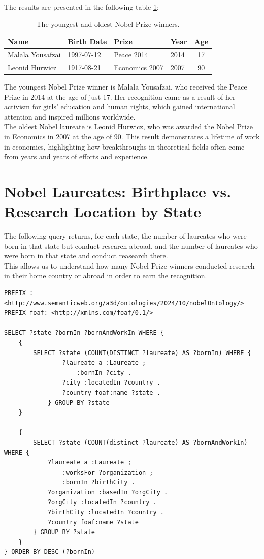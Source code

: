 \documentclass{article}
\begin{document}
The results are presented in the following table \ref{tab:youngest_oldest}:

\begin{table}[H]
	\centering
	\caption{The youngest and oldest Nobel Prize winners.}
	\begin{tabular}{|l|l|l|l|c|}
		\hline
		\textbf{Name}    & \textbf{Birth Date} & \textbf{Prize} & \textbf{Year} & \textbf{Age} \\ \hline
		Malala Yousafzai & 1997-07-12          & Peace 2014     & 2014          & 17           \\ \hline
		Leonid Hurwicz   & 1917-08-21          & Economics 2007 & 2007          & 90           \\ \hline
	\end{tabular}
	\label{tab:youngest_oldest}
\end{table}

The youngest Nobel Prize winner is Malala Yousafzai, who received the Peace Prize in 2014 at the age of just 17.
Her recognition came as a result of her activism for girls' education and human rights, which gained international
attention and inspired millions worldwide.\\
The oldest Nobel laureate is Leonid Hurwicz, who was awarded the Nobel Prize in Economics in 2007 at the age of 90.
This result demonstrates a lifetime of work in economics, highlighting how breakthroughs in theoretical fields
often come from years and years of efforts and experience.

\section{Nobel Laureates: Birthplace vs. Research Location by State}
The following query returns, for each state, the number of laureates who were born in that state but conduct research abroad, and the number of
laureates who were born in that state and conduct reasearch there.\\
This allows us to understand how many Nobel Prize winners conducted research in their home country or abroad in order to earn the recognition.
\begin{lstlisting}
PREFIX : <http://www.semanticweb.org/a3d/ontologies/2024/10/nobelOntology/>
PREFIX foaf: <http://xmlns.com/foaf/0.1/>

SELECT ?state ?bornIn ?bornAndWorkIn WHERE {
	{
        SELECT ?state (COUNT(DISTINCT ?laureate) AS ?bornIn) WHERE {
			    ?laureate a :Laureate ;
			        :bornIn ?city .
			    ?city :locatedIn ?country .
			    ?country foaf:name ?state .
		    } GROUP BY ?state
    }

    {
        SELECT ?state (COUNT(distinct ?laureate) AS ?bornAndWorkIn) WHERE {
            ?laureate a :Laureate ;
                :worksFor ?organization ;
                :bornIn ?birthCity .
            ?organization :basedIn ?orgCity .
            ?orgCity :locatedIn ?country .
            ?birthCity :locatedIn ?country .
            ?country foaf:name ?state
        } GROUP BY ?state
    }
} ORDER BY DESC (?bornIn)
\end{lstlisting}
\end{document}
